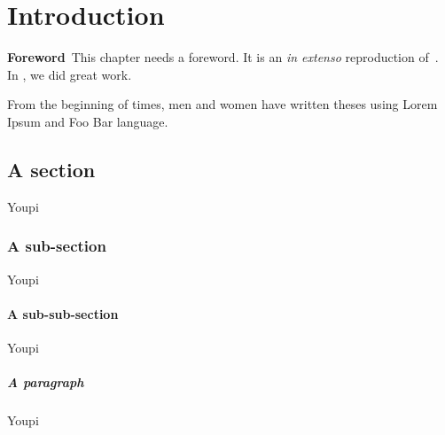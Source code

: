 \chapter{Introduction}
\label{chap:intro}
\minitoc

\begin{center}
\begin{minipage}[b]{0.9\linewidth}
\small
\textbf{Foreword\,}
This chapter needs a foreword. It is an \emph{in extenso} reproduction of~\cite{Ourselin:MICCAI:00}. In \citet{Ourselin:MICCAI:00}, we did great work.
\end{minipage}
\end{center}


From the beginning of times, men and women have written theses using Lorem Ipsum and Foo Bar language.

\section{A section}
%
Youpi

\subsection{A sub-section}
%
Youpi

\subsubsection{A sub-sub-section}
%
Youpi

\paragraph{A paragraph}
%
Youpi